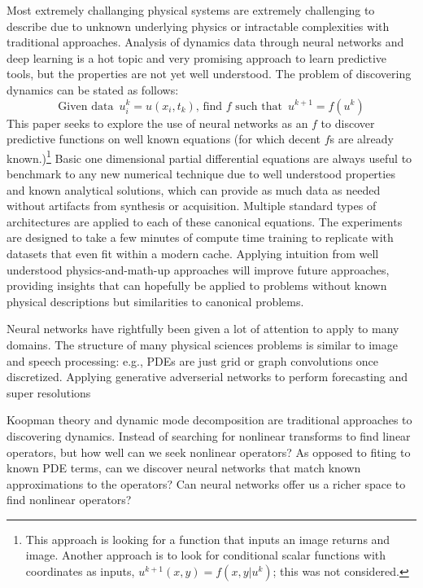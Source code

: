 \documentclass{article}
\begin{document}
Most extremely challanging physical systems are extremely challenging to describe due to unknown underlying physics or intractable complexities with traditional approaches. Analysis of dynamics data through neural networks and deep learning is a hot topic and very promising approach to learn predictive tools, but the properties are not yet well understood. The problem of discovering dynamics can be stated as follows:
\begin{equation}
\textrm{Given data }\, u_i^k=u(x_i,t_k), \,\textrm{find }f\textrm{ such that }\, u^{k+1}=f(u^k)
\end{equation}
This paper seeks to explore the use of neural networks as an $f$ to discover predictive functions on well known equations (for which decent $f$s are already known.)\footnote{This approach is looking for a function that inputs an image returns and image. Another approach is to look for conditional scalar functions with coordinates as inputs, $u^{k+1}(x,y)=f(x,y|u^{k})$; this was not considered. }
Basic one dimensional partial differential equations are always useful to benchmark to any new numerical technique due to well understood properties and known analytical solutions, which can provide as much data as needed without artifacts from synthesis or acquisition.
Multiple standard types of architectures are applied to each of these
canonical equations.
The experiments are designed to take a few minutes of compute time training to replicate with datasets that even fit within a modern cache.
Applying intuition from well understood physics-and-math-up approaches will improve future approaches, providing insights that can hopefully be applied to problems without known physical descriptions but similarities to canonical problems.


Neural networks have rightfully been given a lot of attention to apply to many domains.
The structure of many physical sciences problems is similar to image and speech processing: e.g., PDEs are just grid or graph convolutions once discretized.
Applying generative adverserial networks to perform forecasting and super resolutions

Koopman theory and dynamic mode decomposition are traditional approaches to discovering dynamics.
Instead of searching for nonlinear transforms to find linear operators, but how well can we seek nonlinear operators?
As opposed to fiting to known PDE terms, can we discover neural networks that match known approximations to the operators?  Can neural networks offer us a richer space to find nonlinear operators?
\end{document}
